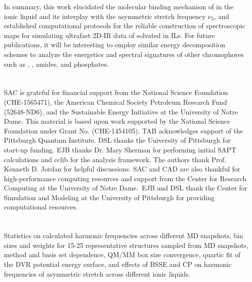 \documentclass[%
  class = book,%
  crop = false,%
  float = true,%
  multi = true,%
  preview = false,%
]{standalone}
\begin{document}
In summary, this work elucidated the molecular binding mechanism of  in the \ce{[C4C1im][PF6]} ionic liquid and its interplay with the  asymmetric stretch frequency \(\nu_{3}\), and established computational protocols for the reliable construction of spectroscopic maps for simulating ultrafast 2D-IR data of  solvated in ILs. For future publications, it will be interesting to employ similar energy decomposition schemes to analyze the energetics and spectral signatures of other chromophores such as , , amides, and phosphates.

\section{\texorpdfstring{}{Acknowledgements}}

SAC is grateful for financial support from the National Science Foundation (CHE-1565471), the American Chemical Society Petroleum Research Fund (52648-ND6), and the Sustainable Energy Initiative at the University of Notre Dame. This material is based upon work supported by the National Science Foundation under Grant No. (CHE-1454105). TAB acknowledges support of the Pittsburgh Quantum Institute. DSL thanks the University of Pittsburgh for start-up funding. EJB thanks Dr. Mary Sherman for performing initial SAPT calculations and cclib\cite{OBoyle2008,Berquist2015} for the analysis framework. The authors thank Prof. Kenneth D. Jordan for helpful discussions. SAC and CAD are also thankful for high-performance computing resources and support from the Center for Research Computing at the University of Notre Dame.~EJB and DSL thank the Center for Simulation and Modeling at the University of Pittsburgh for providing computational resources.

\section{\texorpdfstring{}{Supporting Information}}
\label{paper_02:sec:SI}

Statistics on calculated harmonic frequencies across different MD snapshots, bin sizes and weights for 15-25 representative structures sampled from MD snapshots, method and basis set dependence, QM/MM box size convergence, quartic fit of the DVR potential energy surface, and effects of BSSE and CP on harmonic frequencies of  asymmetric stretch across different ionic liquids.
\end{document}

